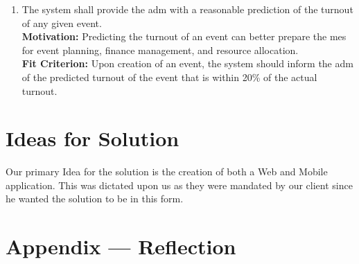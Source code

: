\documentclass[12pt]{article}
\begin{document}
\begin{enumerate}[align=left,
  leftmargin=*,
  labelsep=1em,
  itemindent=0em,
  label=\bfseries WR-\arabic*:,
  ref=\bfseries WR-\arabic*]
  \item \label{WR5} The system shall provide the \gls{adm} with a reasonable prediction of the turnout of any given event.\\[2mm]
  {\bf Motivation:} Predicting the turnout of an event can better prepare the \gls{mes} for event planning, finance management, and resource allocation.\\
  {\bf Fit Criterion:} Upon creation of an event, the system should inform the \gls{adm} of the predicted turnout of the event that is within 20\% of the actual turnout.
  
\end{enumerate}


\section{Ideas for Solution}
Our primary Idea for the solution is the creation of both a Web and Mobile application. This was dictated upon us as they were mandated by our client since he wanted the solution to be in this form. 


\newpage{}
\section*{Appendix --- Reflection}




\end{document}

